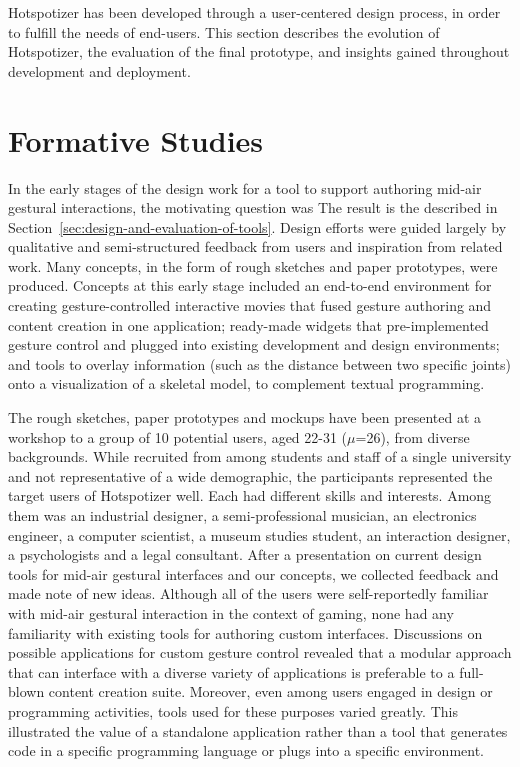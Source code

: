 Hotspotizer has been developed through a user-centered design process, in order to fulfill the needs of end-users. This section describes the evolution of Hotspotizer, the evaluation of the final prototype, and insights gained throughout development and deployment.

\section{Formative Studies}
\label{sec:formative-studies}

In the early stages of the design work for a tool to support authoring mid-air gestural interactions, the motivating question was  The result is the  described in Section~\ref{sec:design-and-evaluation-of-tools}. Design efforts were guided largely by qualitative and semi-structured feedback from users and inspiration from related work. Many concepts, in the form of rough sketches and paper prototypes, were produced. Concepts at this early stage included an end-to-end environment for creating gesture-controlled interactive movies that fused gesture authoring and content creation in one application; ready-made widgets that pre-implemented gesture control and plugged into existing development and design environments; and tools to overlay information (such as the distance between two specific joints) onto a visualization of a skeletal model, to complement textual programming.

The rough sketches, paper prototypes and mockups have been presented at a workshop to a group of 10 potential users, aged 22-31 ($\mu$=26), from diverse backgrounds. While recruited from among students and staff of a single university and not representative of a wide demographic, the participants represented the target users of Hotspotizer well. Each had different skills and interests. Among them was an industrial designer, a semi-professional musician, an electronics engineer, a computer scientist, a museum studies student, an interaction designer, a psychologists and a legal consultant. After a presentation on current design tools for mid-air gestural interfaces and our concepts, we collected feedback and made note of new ideas. Although all of the users were self-reportedly familiar with mid-air gestural interaction in the context of gaming, none had any familiarity with existing tools for authoring custom interfaces. Discussions on possible applications for custom gesture control revealed that a modular approach that can interface with a diverse variety of applications is preferable to a full-blown content creation suite. Moreover, even among users engaged in design or programming activities, tools used for these purposes varied greatly. This illustrated the value of a standalone application rather than a tool that generates code in a specific programming language or plugs into a specific environment.

